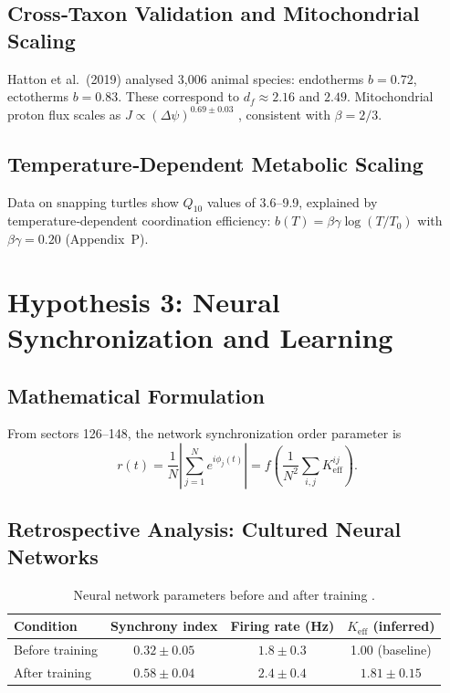 \documentclass[11pt,a4paper]{article}
\begin{document}
	\subsection{Cross‑Taxon Validation and Mitochondrial Scaling}
	
	Hatton et al.\ (2019) analysed 3,006 animal species: endotherms \(b=0.72\), ectotherms \(b=0.83\). These correspond to \(d_f \approx 2.16\) and \(2.49\). Mitochondrial proton flux scales as \(J \propto (\Delta \psi)^{0.69 \pm 0.03}\) \cite{West2023}, consistent with \(\beta=2/3\).
	
	\subsection{Temperature‑Dependent Metabolic Scaling}
	
	Data on snapping turtles show \(Q_{10}\) values of 3.6–9.9, explained by temperature‑dependent coordination efficiency: \(b(T) = \beta\gamma \log(T/T_0)\) with \(\beta\gamma = 0.20\) (Appendix~P).
	
	\section{Hypothesis 3: Neural Synchronization and Learning}
	
	\subsection{Mathematical Formulation}
	
	From sectors 126–148, the network synchronization order parameter is
	\begin{equation}
		r(t) = \frac{1}{N}\left|\sum_{j=1}^N e^{i\phi_j(t)}\right| = f\left(\frac{1}{N^2}\sum_{i,j} K_{\text{eff}}^{ij}\right).
		\label{eq:sync_order}
	\end{equation}
	
	\subsection{Retrospective Analysis: Cultured Neural Networks}
	
	\begin{table}[H]
		\centering
		\caption{Neural network parameters before and after training \cite{PLOS2025b}.}
		\label{tab:neural-training}
		\begin{tabular}{lccc}
			\toprule
			\textbf{Condition} & \textbf{Synchrony index} & \textbf{Firing rate (Hz)} & \(K_{\text{eff}}\) (inferred) \\
			\midrule
			Before training & \(0.32 \pm 0.05\) & \(1.8 \pm 0.3\) & 1.00 (baseline) \\
			After training & \(0.58 \pm 0.04\) & \(2.4 \pm 0.4\) & \(1.81 \pm 0.15\) \\
			\bottomrule
		\end{tabular}
	\end{table}
	
\end{document}
